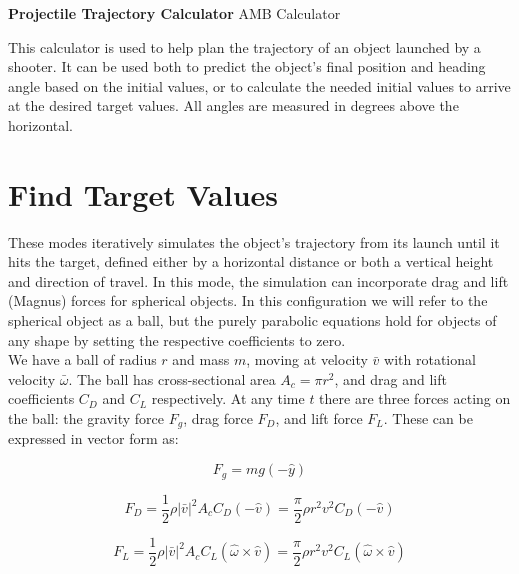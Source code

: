 \documentclass[a4paper]{article}
\begin{document}
	
	\Huge\textbf{Projectile Trajectory Calculator}
	\newline
	\LARGE AMB Calculator
	
	\vspace{0.5cm}
	\normalsize
	
	This calculator is used to help plan the trajectory of an object launched by a shooter. It can be used both to predict the object's final position and heading angle based on the initial values, or to calculate the needed initial values to arrive at the desired target values. All angles are measured in degrees above the horizontal.
	
	
	\section*{Find Target Values}
	
	These modes iteratively simulates the object's trajectory from its launch until it hits the target, defined either by a horizontal distance or both a vertical height and direction of travel. In this mode, the simulation can incorporate drag and lift (Magnus) forces for spherical objects. In this configuration we will refer to the spherical object as a ball, but the purely parabolic equations hold for objects of any shape by setting the respective coefficients to zero.\\
	
	We have a ball of radius $ r $ and mass $ m $, moving at velocity $ \bar{v} $ with rotational velocity $ \bar{\omega} $. The ball has cross-sectional area $ A_c = \pi r^2 $, and drag and lift coefficients $ C_D $ and $ C_L $ respectively. At any time $ t $ there are three forces acting on the ball: the gravity force $ F_g $, drag force $ F_D $, and lift force $ F_L $. These can be expressed in vector form as:
	
	\begin{equation}
		F_g = m g \left( - \hat{y} \right)
	\end{equation}
	
	\begin{equation}
		F_D = \frac{1}{2} \rho \left| \bar{v} \right|^2 A_c C_D \left( - \hat{v} \right)
		= \frac{\pi}{2} \rho r^2 v^2 C_D \left( -\hat{v} \right)
	\end{equation}
	
	\begin{equation}
		F_L = \frac{1}{2} \rho \left| \bar{v} \right|^2 A_c C_L \left( \hat{\omega} \times \hat{v} \right)
		= \frac{\pi}{2} \rho r^2 v^2 C_L \left( \hat{\omega} \times \hat{v} \right)
	\end{equation}\\
	
\end{document}
